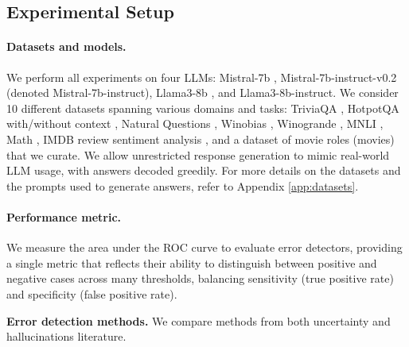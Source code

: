 \documentclass{article} %
\begin{document}
\subsection{Experimental Setup}

\paragraph{Datasets and models.} We perform all experiments on four LLMs: Mistral-7b \citep{jiang2023mistral7b}, Mistral-7b-instruct-v0.2 (denoted Mistral-7b-instruct), Llama3-8b \citep{touvron2023llama}, and Llama3-8b-instruct.
We consider 10 different datasets spanning various domains and tasks: TriviaQA \citep{joshi2017triviaqa}, HotpotQA with/without context \citep{yang2018hotpotqa}, Natural Questions \citep{natural_qurstions}, Winobias \citep{zhao2018gender}, Winogrande \citep{sakaguchi2021winogrande}, MNLI \citep{mnli}, Math \citep{sun2024benchmarking}, IMDB review sentiment analysis \citep{imdb_dataset}, and a dataset of movie roles (movies) that we curate.
We allow unrestricted response generation to mimic real-world LLM usage, with answers decoded greedily.
For more details on the datasets and the prompts used to generate answers, refer to Appendix \ref{app:datasets}.

\paragraph{Performance metric.}
We measure the area under the ROC curve to evaluate error detectors, providing a single metric that reflects their ability to distinguish between positive and negative cases across many thresholds, balancing sensitivity (true positive rate) and specificity (false positive rate).


\textbf{Error detection methods.}
We compare methods from both uncertainty and hallucinations literature.

\end{document}
